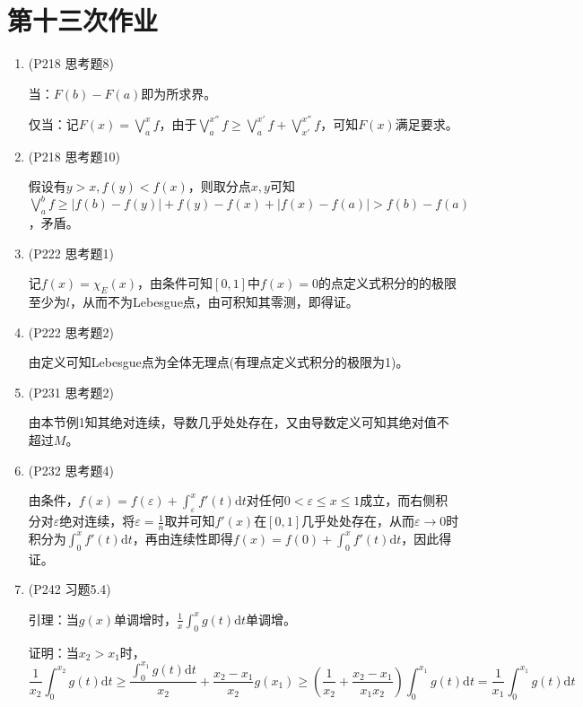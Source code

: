 \documentclass[a4paper,UTF8,fontset=windows]{ctexart}
\begin{document}
\section{第十三次作业}
\begin{enumerate}
    \item (P218 思考题8)
    
    当：$F(b)-F(a)$即为所求界。
    
    仅当：记$F(x)=\bigvee_a^xf$，由于$\bigvee_a^{x''}f\ge\bigvee_a^{x'}f+\bigvee_{x'}^{x''}f$，可知$F(x)$满足要求。
    
    \item (P218 思考题10)
    
    假设有$y>x,f(y)<f(x)$，则取分点$x,y$可知$\bigvee_a^bf\ge|f(b)-f(y)|+f(y)-f(x)+|f(x)-f(a)|>f(b)-f(a)$，矛盾。
    
    \item (P222 思考题1)
    
    记$f(x)=\chi_E(x)$，由条件可知$[0,1]$中$f(x)=0$的点定义式积分的的极限至少为$l$，从而不为Lebesgue点，由可积知其零测，即得证。
    
    \item (P222 思考题2)
    
    由定义可知Lebesgue点为全体无理点(有理点定义式积分的极限为1)。
    
    \item (P231 思考题2)
    
    由本节例1知其绝对连续，导数几乎处处存在，又由导数定义可知其绝对值不超过$M$。
    
    \item (P232 思考题4)
    
    由条件，$f(x)=f(\varepsilon)+\int_\varepsilon^xf'(t)\mathrm{d}t$对任何$0<\varepsilon\le x\le1$成立，而右侧积分对$\varepsilon$绝对连续，将$\varepsilon=\frac{1}{n}$取并可知$f'(x)$在$[0,1]$几乎处处存在，从而$\varepsilon\to0$时积分为$\int_0^xf'(t)\mathrm{d}t$，再由连续性即得$f(x)=f(0)+\int_0^xf'(t)\mathrm{d}t$，因此得证。
    
    \item (P242 习题5.4)
    
    引理：当$g(x)$单调增时，$\frac{1}{x}\int_0^xg(t)\mathrm{d}t$单调增。
    
    证明：当$x_2>x_1$时，
    \[\frac{1}{x_2}\int_0^{x_2}g(t)\mathrm{d}t\ge\frac{\int_0^{x_1}g(t)\mathrm{d}t}{x_2}+\frac{x_2-x_1}{x_2}g(x_1)\ge(\frac{1}{x_2}+\frac{x_2-x_1}{x_1x_2})\int_0^{x_1}g(t)\mathrm{d}t=\frac{1}{x_1}\int_0^{x_1}g(t)\mathrm{d}t\]
    

\end{enumerate}
\end{document}
